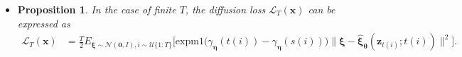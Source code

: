 \documentclass[10pt]{article}
\newtheorem{proposition}[lemma]{Proposition}
\newcommand{\ve}[1]{\mathbf{#1}}
\newcommand{\ves}[1]{\boldsymbol{#1}}
\newcommand{\mrm}[1]{\mathrm{#1}}
\newcommand{\mcal}[1]{\mathcal{#1}}
\newcommand{\SNR}{\mathrm{SNR}}
\begin{document}
\begin{itemize}
\begin{proof}
\begin{align*}
    \mcal{L}_T(\ve{x})
    &= \sum_{i=1}^T E_{\ve{z}_t \sim q(\ve{z}_t|\ve{x})} [
      D_{KL}(
      q(\ve{z}_s | \ve{z}_t, \ve{x})
      \| p(\ve{z}_s | \ve{z}_t) )
    ] \\
    &= \frac{1}{2} \sum_{i=1}^T E_{\ve{z}_t \sim q(\ve{z}_t|\ve{x})} \Big[ \big( \SNR(s) - \SNR(t) \big) \| \ve{x} - \hat{\ve{x}}_{\ves{\theta}}(\ve{z}_t; t) \|^2 \Big] \\
    &= \frac{1}{2} \sum_{i=1}^T E_{\ves{\xi} \sim \mcal{N}(\ve{0}, I)} \Big[ \big( \SNR(s) - \SNR(t) \big) \| \ve{x} - \hat{\ve{x}}_{\ves{\theta}}(\ve{z}_t; t) \|^2 \Big] \\
    &= \frac{T}{2} \sum_{i=1}^T E_{\ves{\xi} \sim \mcal{N}(\ve{0}, I), i \sim \mcal{U}\{1:T\}} \Big[ \big( \SNR(s) - \SNR(t) \big) \| \ve{x} - \hat{\ve{x}}_{\ves{\theta}}(\ve{z}_t; t) \|^2 \Big]
  \end{align*}
  as required.
\end{proof}

\item \begin{proposition} \label{thm:diffusion-loss-expm1-finite}
  In the case of finite $T$, the diffusion loss $\mcal{L}_T(\ve{x})$ can be expressed as
  \begin{align*}
    \mcal{L}_T(\ve{x})
    &= \frac{T}{2} 
    E_{\ves{\xi} \sim \mcal{N}(\ves{0},I), i \sim \mcal{U}\{1:T\}} \Big[ 
      \mrm{expm1}\big(\gamma_{\ves{\eta}}(t(i)) - \gamma_{\ves{\eta}}(s(i)) \big) \| \ve{\xi} - \hat{\ve{\xi}}_{\ves{\theta}}(\ve{z}_{t(i)}; t(i)) \|^2 \Big].
  \end{align*}
\end{proposition}


\end{itemize}
\end{document}
